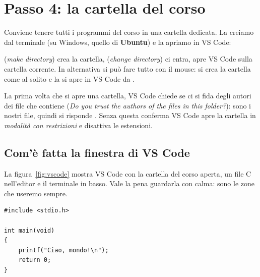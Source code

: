 \section{Passo 4: la cartella del corso}

Conviene tenere tutti i programmi del corso in una cartella dedicata. La
creiamo dal terminale (su Windows, quello di \textbf{Ubuntu}) e la apriamo
in VS Code:


 (\textit{make directory}) crea la cartella, 
(\textit{change directory}) ci entra,  apre VS Code sulla
cartella corrente. In alternativa si può fare tutto con il mouse: si crea
la cartella come al solito e la si apre in VS Code da .

La prima volta che si apre una cartella, VS Code chiede se ci si fida
degli autori dei file che contiene (\textit{Do you trust the authors of the
files in this folder?}): sono i nostri file, quindi si risponde
. Senza questa conferma VS Code apre la
cartella in \textit{modalità con restrizioni} e disattiva le estensioni.

\subsection{Com'è fatta la finestra di VS Code}

La figura~\ref{fig:vscode} mostra VS Code con la cartella del corso
aperta, un file C nell'editor e il terminale in basso. Vale la pena
guardarla con calma: sono le zone che useremo sempre.

\newsavebox{\vsceditor}
\begin{lrbox}{\vsceditor}
\begin{minipage}{12.6cm}
\begin{lstlisting}[style=c, aboveskip=0pt, belowskip=0pt]
#include <stdio.h>

int main(void)
{
    printf("Ciao, mondo!\n");
    return 0;
}
\end{lstlisting}
\end{minipage}
\end{lrbox}

